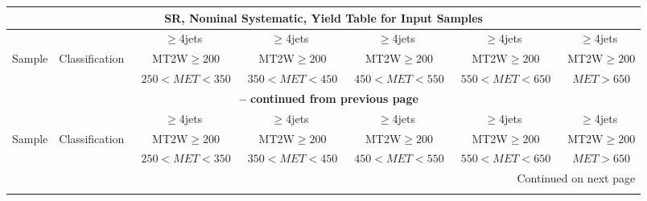 \documentclass{article}
\begin{document}
 
 
 
 
\pagebreak 

 
 
 
 
\begin{longtable}{|l|c|c|c|c|c|c|} 
 
\multicolumn{7}{c}{ SR, Nominal Systematic, Yield Table for Input Samples }\\* \hline 
 &  & $\ge$4jets  & $\ge$4jets  & $\ge$4jets  & $\ge$4jets  & $\ge$4jets \\* 
Sample & Classification  & ~MT2W$\ge200$  & ~MT2W$\ge200$  & ~MT2W$\ge200$  & ~MT2W$\ge200$  & ~MT2W$\ge200$ \\* 
 &  & ~$250<MET<350$  & ~$350<MET<450$  & ~$450<MET<550$  & ~$550<MET<650$  & ~$MET>650$ \\* 
\hline \hline 
\endfirsthead 
 
\multicolumn{7}{c}{{\bfseries \tablename\ \thetable{} -- continued from previous page}}\\* \hline 
 &  & $\ge$4jets  & $\ge$4jets  & $\ge$4jets  & $\ge$4jets  & $\ge$4jets \\* 
Sample & Classification  & ~MT2W$\ge200$  & ~MT2W$\ge200$  & ~MT2W$\ge200$  & ~MT2W$\ge200$  & ~MT2W$\ge200$ \\* 
 &  & ~$250<MET<350$  & ~$350<MET<450$  & ~$450<MET<550$  & ~$550<MET<650$  & ~$MET>650$ \\* 
\hline \hline 
\endhead 
 
\multicolumn{7}{|r|}{{Continued on next page}}\\* \hline 
\endfoot 
 
 
\endlastfoot 
 

\end{longtable}
\end{document}
